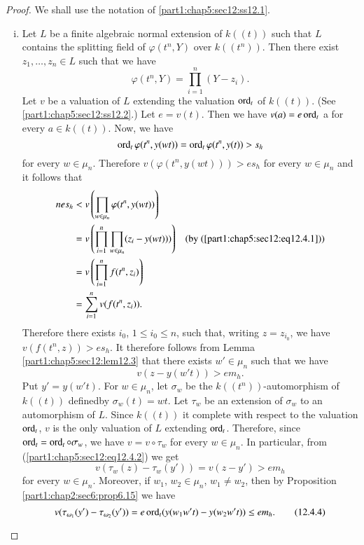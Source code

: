 \begin{proof}
  We shall use the notation of \ref{part1:chap5:sec12:ss12.1}.
  \begin{enumerate}[(i)]
  \item Let $L$ be a finite algebraic normal extension of $k((t))$
    such that $L$ contains the splitting field of $\varphi (t^n, Y)$
    over $k((t^n))$. Then there exist $z_1 , \ldots, z_n \in L$ such
    that we have
    \begin{equation*}
      \varphi (t^n , Y) = \prod^n_{i=1} (Y -
      z_i).\tag{12.4.1}\label{part1:chap5:sec12:eq12.4.1} 
    \end{equation*}
    Let $v$ be a valuation of $L$ extending the valuation $\operatorname{ord}_t$ of
    $k((t))$. (See \ref{part1:chap5:sec12:ss12.2}.) Let $e =
    v(t)$. Then we have $v(a)= e \operatorname{ord}_t$ a for every $a \in
    k((t))$. Now, we have
    $$
    \operatorname{ord}_t \varphi(t^n, y(wt))= \operatorname{ord}_t \varphi (t^n, y(t)) > s_h
    $$
    for every $w \in \mu_n$. Therefore $v(\varphi (t^n, y (wt))) >
    es_h$ for every $w \in \mu_n$ and it follows that
    \begin{align*}
      nes_h & < v \left(\prod_{w \in \mu_n} \varphi (t^n, y(wt))
      \right)\\
      & = v \left( \prod^n_{i=1} \prod_{w \in \mu_n} (z_i -
      y(wt)))\right) & \text{(by
        (\ref{part1:chap5:sec12:eq12.4.1}))}\\
      & = v\left( \prod^n_{i=1} f(t^n, z_i)\right)\\
      & = \sum^n_{i=1} v(f(t^n, z_i)).
    \end{align*}
    Therefore there exists $i_0$, $1 \leq i_0 \leq n$, such that,
    writing $z= z_{i_0}$, we have $v(f(t^n, z)) > es_h$. It therefore
    follows from Lemma \ref{part1:chap5:sec12:lem12.3} that there
    exists $w' \in \mu_n$ such that we have
    \begin{equation*}
      v (z-y (w't)) >
      em_h. \tag{12.4.2}\label{part1:chap5:sec12:eq12.4.2} 
    \end{equation*}
    Put $y' = y (w' t)$. For $w \in \mu_n$, let $\sigma_w$ be
    the $k((t^n))$-automorphism of $k((t))$ defined\pageoriginale by
    $\sigma_w (t)=wt$. Let $\tau_w$ be an extension of $\sigma_w$ to
    an automorphism of $L$. Since $k((t))$ it complete with respect to
    the valuation $\operatorname{ord}_t$, $v$ is the only valuation of $L$ extending
    $\operatorname{ord}_t$. Therefore, since $\operatorname{ord}_t= \operatorname{ord}_t \circ \sigma_w$, we
    have $v= v \circ \tau_w$ for every $w \in \mu_n$. In particular,
    from (\ref{part1:chap5:sec12:eq12.4.2}) we get
    \begin{equation*}
      v(\tau_w (z) - \tau_w (y')) = v (z- y')> em_h
      \tag{12.4.3}\label{part1:chap5:sec12:eq12.4.3}  
    \end{equation*}
    for every $w \in \mu_n$. Moreover, if $w_1$, $w_2 \in \mu_n$, $w_1
    \neq w_2$, then by Proposition \ref{part1:chap2:sec6:prop6.15} we
    have
    \begin{equation*}
v(\tau_{\omega_1} (y') - \tau_{\omega_2} (y'))  = e \operatorname{ord}_t (y (w_1 w't)- y(w_2 w't)) \leq e   m_h.\tag{12.4.4}\label{part1:chap5:sec12:eq12.4.4}    
    \end{equation*}


\end{enumerate}
\end{proof}
